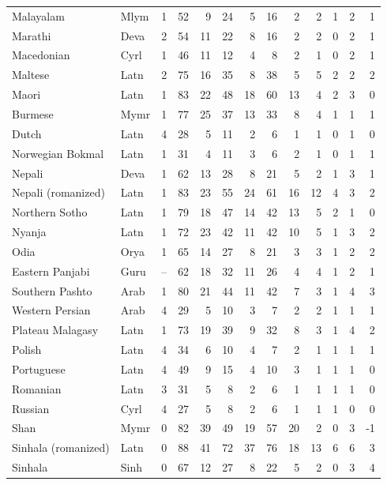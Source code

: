 \begin{small}
\begin{longtable}{llrrrrrrrrrrr}
Malayalam & Mlym & 1 & 52 & 9 & 24 & 5 & 16 & 2 & 2 & 1 & 2 & 1 \\
Marathi & Deva & 2 & 54 & 11 & 22 & 8 & 16 & 2 & 2 & 0 & 2 & 1 \\
Macedonian & Cyrl & 1 & 46 & 11 & 12 & 4 & 8 & 2 & 1 & 0 & 2 & 1 \\
Maltese & Latn & 2 & 75 & 16 & 35 & 8 & 38 & 5 & 5 & 2 & 2 & 2 \\
Maori & Latn & 1 & 83 & 22 & 48 & 18 & 60 & 13 & 4 & 2 & 3 & 0 \\
Burmese & Mymr & 1 & 77 & 25 & 37 & 13 & 33 & 8 & 4 & 1 & 1 & 1 \\
Dutch & Latn & 4 & 28 & 5 & 11 & 2 & 6 & 1 & 1 & 0 & 1 & 0 \\
Norwegian Bokmal & Latn & 1 & 31 & 4 & 11 & 3 & 6 & 2 & 1 & 0 & 1 & 1 \\
Nepali & Deva & 1 & 62 & 13 & 28 & 8 & 21 & 5 & 2 & 1 & 3 & 1 \\
Nepali (romanized) & Latn & 1 & 83 & 23 & 55 & 24 & 61 & 16 & 12 & 4 & 3 & 2 \\
Northern Sotho & Latn & 1 & 79 & 18 & 47 & 14 & 42 & 13 & 5 & 2 & 1 & 0 \\
Nyanja & Latn & 1 & 72 & 23 & 42 & 11 & 42 & 10 & 5 & 1 & 3 & 2 \\
Odia & Orya & 1 & 65 & 14 & 27 & 8 & 21 & 3 & 3 & 1 & 2 & 2 \\
Eastern Panjabi & Guru & -- & 62 & 18 & 32 & 11 & 26 & 4 & 4 & 1 & 2 & 1 \\
Southern Pashto & Arab & 1 & 80 & 21 & 44 & 11 & 42 & 7 & 3 & 1 & 4 & 3 \\
Western Persian & Arab & 4 & 29 & 5 & 10 & 3 & 7 & 2 & 2 & 1 & 1 & 1 \\
Plateau Malagasy & Latn & 1 & 73 & 19 & 39 & 9 & 32 & 8 & 3 & 1 & 4 & 2 \\
Polish & Latn & 4 & 34 & 6 & 10 & 4 & 7 & 2 & 1 & 1 & 1 & 1 \\
Portuguese & Latn & 4 & 49 & 9 & 15 & 4 & 10 & 3 & 1 & 1 & 1 & 0 \\
Romanian & Latn & 3 & 31 & 5 & 8 & 2 & 6 & 1 & 1 & 1 & 1 & 0 \\
Russian & Cyrl & 4 & 27 & 5 & 8 & 2 & 6 & 1 & 1 & 1 & 0 & 0 \\
Shan & Mymr & 0 & 82 & 39 & 49 & 19 & 57 & 20 & 2 & 0 & 3 & -1 \\
Sinhala (romanized) & Latn & 0 & 88 & 41 & 72 & 37 & 76 & 18 & 13 & 6 & 6 & 3 \\
Sinhala & Sinh & 0 & 67 & 12 & 27 & 8 & 22 & 5 & 2 & 0 & 3 & 4 \\

\end{longtable}
\end{small}
